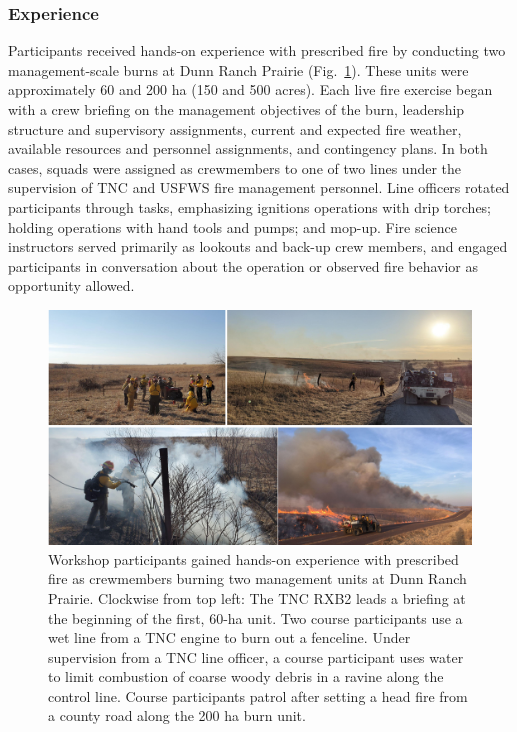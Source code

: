 \documentclass[fire,article,submit,moreauthors,pdftex]{Definitions/mdpi}
\begin{document}
\subsubsection{Experience}

Participants received hands-on experience with prescribed fire by conducting two management-scale burns at Dunn Ranch Prairie (Fig.~\ref{FireExperience}).
These units were approximately 60 and 200 ha (150 and 500 acres).
Each live fire exercise began with a crew briefing on the management objectives of the burn, leadership structure and supervisory assignments, current and expected fire weather, available resources and personnel assignments, and contingency plans.
In both cases, squads were assigned as crewmembers to one of two lines under the supervision of TNC and USFWS fire management personnel.
Line officers rotated participants through tasks, emphasizing ignitions operations with drip torches; holding operations with hand tools and pumps; and mop-up.
Fire science instructors served primarily as lookouts and back-up crew members, and engaged participants in conversation about the operation or observed fire behavior as opportunity allowed.


\begin{figure}
\centering
\includegraphics[width=1\columnwidth]{FireExperience.pdf}
\caption{Workshop participants gained hands-on experience with prescribed fire as crewmembers burning two management units at Dunn Ranch Prairie. Clockwise from top left: The TNC RXB2 leads a briefing at the beginning of the first, 60-ha unit. Two course participants use a wet line from a TNC engine to burn out a fenceline. Under supervision from a TNC line officer, a course participant uses water to limit combustion of coarse woody debris in a ravine along the control line. Course participants patrol after setting a head fire from a county road along the 200 ha burn unit.}
\label{FireExperience}
\end{figure}
\end{document}
